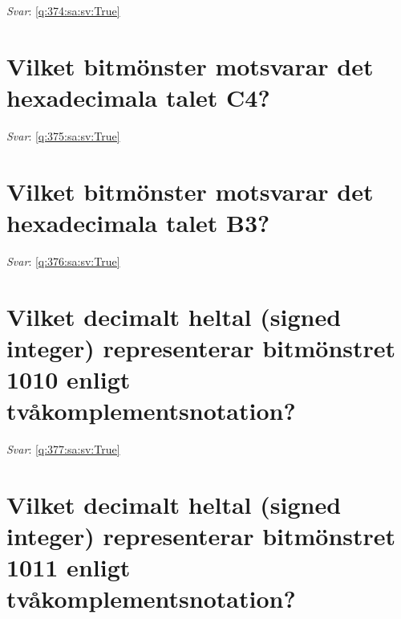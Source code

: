 \documentclass[a4paper,11pt,oneside]{book}
\begin{document}
\begin{sloppypar}
\noindent\makebox[\textwidth]{\hrulefill}

\vspace{1cm}

\textit{Svar}: \autoref{q:374:sa:sv:True}



\section{Vilket bitm\"onster motsvarar det hexadecimala talet C4?}

\label{q:375:sa:sv:False}

\vspace{2cm}

\noindent\makebox[\textwidth]{\hrulefill}

\vspace{1cm}

\textit{Svar}: \autoref{q:375:sa:sv:True}



\section{Vilket bitm\"onster motsvarar det hexadecimala talet B3?}

\label{q:376:sa:sv:False}

\vspace{2cm}

\noindent\makebox[\textwidth]{\hrulefill}

\vspace{1cm}

\textit{Svar}: \autoref{q:376:sa:sv:True}



\section{Vilket decimalt heltal (signed integer) representerar bitm\"onstret 1010 enligt tv\r{a}komplementsnotation?}

\label{q:377:sa:sv:False}

\vspace{2cm}

\noindent\makebox[\textwidth]{\hrulefill}

\vspace{1cm}

\textit{Svar}: \autoref{q:377:sa:sv:True}



\section{Vilket decimalt heltal (signed integer) representerar bitm\"onstret 1011 enligt tv\r{a}komplementsnotation?}


\end{sloppypar}
\end{document}
